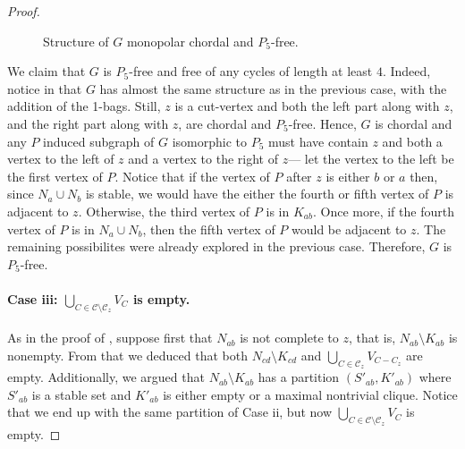 \begin{proof}
\begin{figure}[htb!]
        \caption{Structure of $G$ monopolar chordal and $P_5$-free.}
        \label{fig:chordal_structure_2}
    \end{figure}

    We claim that $G$ is $P_5$-free and free of any cycles of length at least
    $4$. Indeed, notice in  that $G$ has almost
    the same structure as in the previous case, with the addition of the 1-bags.
    Still, $z$ is a cut-vertex and both the left part along with $z$, and the
    right part along with $z$, are chordal and $P_5$-free. Hence, $G$ is chordal
    and any $P$ induced subgraph of $G$ isomorphic to $P_5$ must have contain
    $z$ and both a vertex to the left of $z$ and a vertex to the right of $z$---
    let the vertex to the left be the first vertex of $P$. Notice that if the
    vertex of $P$ after $z$ is either $b$ or $a$ then, since $N_a\cup N_b$ is
    stable, we would have the either the fourth or fifth vertex of $P$ is
    adjacent to $z$. Otherwise, the third vertex of $P$ is in $K_{ab}$. Once
    more, if the fourth vertex of $P$ is in $N_a\cup N_b$, then the fifth vertex
    of $P$ would be adjacent to $z$. The remaining possibilites were already
    explored in the previous case. Therefore, $G$ is $P_5$-free. 

    \paragraph{Case iii: $\bigcup_{C\in\mathcal{C}\setminus \mathcal{C}_z} V_C$
    is empty.} As in the proof of , suppose first
    that $N_{ab}$ is not complete to $z$, that is, $N_{ab}\setminus K_{ab}$ is
    nonempty. From that we deduced that both $N_{cd}\setminus K_{cd}$ and
    $\bigcup_{C\in\mathcal{C}_z} V_{C-C_z}$ are empty. Additionally, we argued
    that $N_{ab}\setminus K_{ab}$ has a partition $(S'_{ab},K'_{ab})$ where
    $S'_{ab}$ is a stable set and $K'_{ab}$ is either empty or a maximal
    nontrivial clique. Notice that we end up with the same partition of Case ii,
    but now $\bigcup_{C\in\mathcal{C} \setminus \mathcal{C}_z} V_C$ is empty.


\end{proof}

